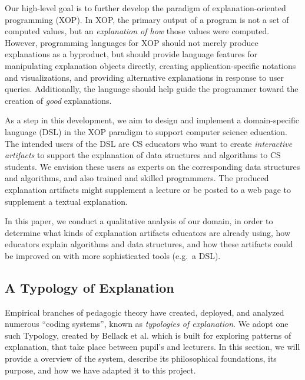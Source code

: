 \documentclass[conference]{IEEEtran}
\begin{document}
Our high-level goal is to further develop the paradigm of explanation-oriented
programming (XOP). In XOP, the primary output of a program is not a set of
computed values, but an \emph{explanation of how} those values were computed.
However, programming languages for XOP should not merely produce explanations
as a byproduct, but should provide language features for manipulating
explanation objects directly, creating application-specific notations and
visualizations, and providing alternative explanations in response to user
queries. Additionally, the language should help guide the programmer toward the
creation of \emph{good} explanations.

As a step in this development, we aim to design and implement a domain-specific
language (DSL) in the XOP paradigm to support computer science education. The
intended users of the DSL are CS educators who want to create \emph{interactive
artifacts} to support the explanation of data structures and algorithms to CS
students. We envision these users as experts on the corresponding data
structures and algorithms, and also trained and skilled programmers. The
produced explanation artifacts might supplement a lecture or be posted to a web
page to supplement a textual explanation.

In this paper, we conduct a qualitative analysis of our domain, in order to
determine what kinds of explanation artifacts educators are already using, how
educators explain algorithms and data structures, and how these artifacts could
be improved on with more sophisticated tools (e.g.\ a DSL).


\subsection{A Typology of Explanation}
Empirical branches of pedagogic theory have created, deployed, and analyzed
numerous ``coding systems'', known as \emph{typologies of
  explanation}\cite{westbury1971research, nla.cat-vn407830,
  rosenshine1968objectively, hyman1968teaching, ennis1969logic,
  smith1967language, bellack1966language}. We adopt one such Typology, created
by Bellack et al.\cite{bellack1966language} which is built for exploring
patterns of explanation, that take place between pupil's and lecturers. In this
section, we will provide a overview of the system, describe its philosophical
foundations, its purpose, and how we have adapted it to this project.
\end{document}
